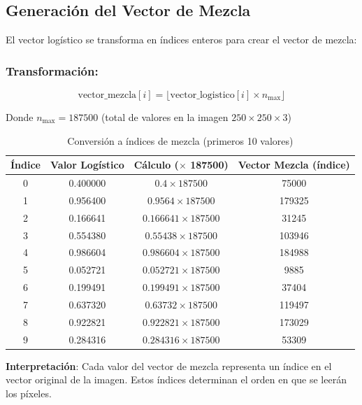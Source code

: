 \documentclass[12pt,a4paper]{article}
\begin{document}
	\subsection{Generación del Vector de Mezcla}
	
	El vector logístico se transforma en índices enteros para crear el vector de mezcla:
	
	\subsubsection*{Transformación:}
	\begin{equation}
		\text{vector\_mezcla}[i] = \lfloor \text{vector\_logistico}[i] \times n_{\text{max}} \rfloor
		\label{eq:mixing}
	\end{equation}
	
	Donde $n_{\text{max}} = 187500$ (total de valores en la imagen $250 \times 250 \times 3$)
	
	\begin{table}[H]
		\centering
		\caption{Conversión a índices de mezcla (primeros 10 valores)}
		\label{tab:mixing}
		\begin{tabular}{@{}cccc@{}}
			\toprule
			\textbf{Índice} & \textbf{Valor Logístico} & \textbf{Cálculo ($\times$ 187500)} & \textbf{Vector Mezcla (índice)} \\ \midrule
			0 & 0.400000 & $0.4 \times 187500$ & 75000 \\
			1 & 0.956400 & $0.9564 \times 187500$ & 179325 \\
			2 & 0.166641 & $0.166641 \times 187500$ & 31245 \\
			3 & 0.554380 & $0.55438 \times 187500$ & 103946 \\
			4 & 0.986604 & $0.986604 \times 187500$ & 184988 \\
			5 & 0.052721 & $0.052721 \times 187500$ & 9885 \\
			6 & 0.199491 & $0.199491 \times 187500$ & 37404 \\
			7 & 0.637320 & $0.63732 \times 187500$ & 119497 \\
			8 & 0.922821 & $0.922821 \times 187500$ & 173029 \\
			9 & 0.284316 & $0.284316 \times 187500$ & 53309 \\ \bottomrule
		\end{tabular}
	\end{table}
	
	\textbf{Interpretación}: Cada valor del vector de mezcla representa un índice en el vector original de la imagen. Estos índices determinan el orden en que se leerán los píxeles.
	
\end{document}
